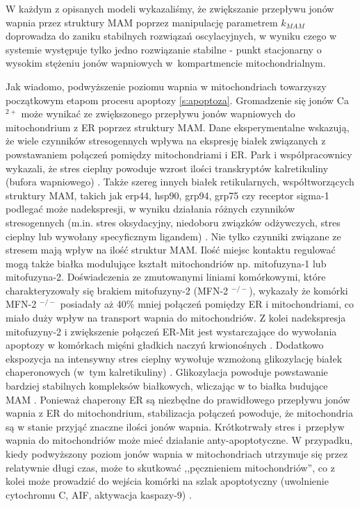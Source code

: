 W każdym z opisanych modeli wykazaliśmy, że zwiększanie przepływu jonów wapnia przez struktury MAM poprzez manipulację parametrem $k_{MAM}$ doprowadza do zaniku stabilnych rozwiązań oscylacyjnych, w wyniku czego w systemie występuje tylko jedno rozwiązanie stabilne - punkt stacjonarny o wysokim stężeniu jonów wapniowych w~kompartmencie mitochondrialnym.

Jak wiadomo, podwyższenie poziomu wapnia w mitochondriach towarzyszy początkowym etapom procesu apoptozy \ref{s:apoptoza}. Gromadzenie się jonów Ca$^{2+}$ może wynikać ze zwiększonego przepływu jonów wapniowych do mitochondrium z ER poprzez struktury MAM. Dane eksperymentalne wskazują, że wiele czynników stresogennych wpływa na ekspresję białek związanych z powstawaniem połączeń pomiędzy mitochondriami i ER. Park i współpracownicy wykazali, że stres cieplny powoduje wzrost ilości transkryptów kalretikuliny (bufora wapniowego)  \cite{Park2001}. Także szereg innych białek retikularnych, współtworzących struktury MAM, takich jak erp44, hsp90, grp94, grp75 czy receptor \mbox{sigma-1} podlegać może nadekspresji, w wyniku działania różnych czynników stresogennych (m.in. stres oksydacyjny, niedoboru związków odżywczych, stres cieplny lub wywołany specyficznym ligandem) \cite{Anelli2002,Ellgaard2001,Hayashi2007}. Nie tylko czynniki związane ze stresem mają wpływ na ilość struktur MAM. Ilość miejsc kontaktu regulować mogą także białka modulujące kształt mitochondriów np. mitofuzyna-1 lub mitofuzyna-2. Doświadczenia ze zmutowanymi liniami komórkowymi, które charakteryzowały się brakiem mitofuzyny-2 (MFN-2 $^{-/-}$), wykazały że komórki MFN-2 $^{-/-}$ posiadały aż 40\% mniej połączeń pomiędzy ER i mitochondriami, co miało duży wpływ na transport wapnia do mitochondriów. Z kolei nadekspresja mitofuzyny-2 i zwiększenie połączeń ER-Mit jest wystarczające do wywołania apoptozy w komórkach mięśni gładkich naczyń krwionośnych \cite{Guo2007}. Dodatkowo ekspozycja na intensywny stres cieplny wywołuje wzmożoną glikozylację białek chaperonowych (w~tym kalretikuliny) \cite{Jethmalani1998}. Glikozylacja powoduje powstawanie bardziej stabilnych kompleksów białkowych, wliczając w to białka budujące MAM \cite{Mizzen1991}. Ponieważ chaperony ER są niezbędne do prawidłowego przepływu jonów wapnia z ER do mitochondrium, stabilizacja połączeń powoduje, że mitochondria są w stanie przyjąć znaczne ilości jonów wapnia. Krótkotrwały stres i~przepływ wapnia do mitochondriów może mieć działanie anty-apoptotyczne. W przypadku, kiedy podwyższony poziom jonów wapnia w mitochondriach utrzymuje się przez relatywnie długi czas, może to skutkować ,,pęcznieniem mitochondriów'', co z kolei może prowadzić do wejścia komórki na szlak apoptotyczny (uwolnienie cytochromu C, AIF, aktywacja kaspazy-9) \cite{Giorgi2012a,Hajnoczky2006,Rasola2007}.